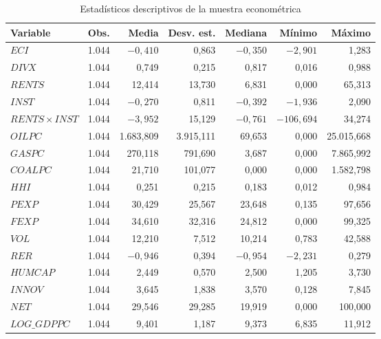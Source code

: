 \documentclass[../../TFM.tex]{subfiles}
\begin{document}
	\begin{table}[htbp]
		\centering
		\caption{Estadísticos descriptivos de la muestra econométrica}
		\label{tab:descriptivos-muestra-econometrica}
		\small
		\renewcommand{\arraystretch}{0.88}
		\setlength{\tabcolsep}{6pt}
		\begin{tabular}{lrrrrrr}
			\toprule
			Variable
			& Obs.
			& Media
			& Desv. est.
			& Mediana
			& Mínimo
			& Máximo \\
			\midrule
			$ECI$                  & 1.044 & $-0,410$ & 0,863 & $-0,350$ & $-2,901$   & 1,283 \\
			$DIVX$                 & 1.044 & 0,749    & 0,215 & 0,817    & 0,016      & 0,988 \\
			$RENTS$                & 1.044 & 12,414   & 13,730 & 6,831   & 0,000      & 65,313 \\
			$INST$                 & 1.044 & $-0,270$ & 0,811 & $-0,392$ & $-1,936$   & 2,090 \\
			$RENTS\times INST$     & 1.044 & $-3,952$ & 15,129 & $-0,761$ & $-106,694$ & 34,274 \\
			$OILPC$                & 1.044 & 1.683,809 & 3.915,111 & 69,653 & 0,000 & 25.015,668 \\
			$GASPC$                & 1.044 & 270,118  & 791,690 & 3,687   & 0,000      & 7.865,992 \\
			$COALPC$               & 1.044 & 21,710   & 101,077 & 0,000   & 0,000      & 1.582,798 \\
			$HHI$                  & 1.044 & 0,251    & 0,215 & 0,183    & 0,012      & 0,984 \\
			$PEXP$                 & 1.044 & 30,429   & 25,567 & 23,648  & 0,135      & 97,656 \\
			$FEXP$                 & 1.044 & 34,610   & 32,316 & 24,812  & 0,000      & 99,325 \\
			$VOL$                  & 1.044 & 12,210   & 7,512 & 10,214   & 0,783      & 42,588 \\
			$RER$                  & 1.044 & $-0,946$ & 0,394 & $-0,954$ & $-2,231$   & 0,279 \\
			$HUMCAP$               & 1.044 & 2,449    & 0,570 & 2,500    & 1,205      & 3,730 \\
			$INNOV$                & 1.044 & 3,645    & 1,838 & 3,570    & 0,128      & 7,845 \\
			$NET$                  & 1.044 & 29,546   & 29,285 & 19,919  & 0,000      & 100,000 \\
			$LOG\_GDPPC$           & 1.044 & 9,401    & 1,187 & 9,373    & 6,835      & 11,912 \\

\end{tabular}
\end{table}
\end{document}
